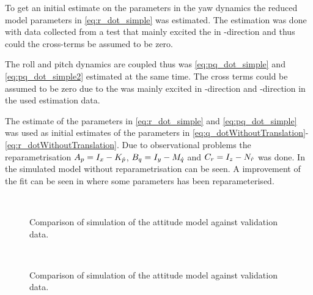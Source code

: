 To get an initial estimate on the parameters in the yaw dynamics the reduced model parameters in \eqref{eq:r_dot_simple}
was estimated. The estimation was done with data collected from a test that mainly excited the \abbrROV in \yawAngle-direction and thus could the cross-terms be assumed to be zero.

The roll and pitch dynamics are coupled thus was \eqref{eq:pq_dot_simple} and \eqref{eq:pq_dot_simple2} estimated at the same time.
The cross terms could be assumed to be zero due to the \abbrROV was mainly excited in \rollAngle-direction and \pitchAngle-direction in the used estimation data.

The estimate of the parameters in \eqref{eq:r_dot_simple} and \eqref{eq:pq_dot_simple} was used as initial estimates of the parameters in \eqref{eq:q_dotWithoutTranslation}-\eqref{eq:r_dotWithoutTranslation}. Due to observational problems the reparametrisation $A_p = I_{x} - K_{\dot{p}}$, $B_q = I_{y} - M_{\dot{q}}$ and $C_r = I_{z} - N_{\dot{r}}$ was done. In  the simulated model without reparametrisation can be seen. A improvement of the fit can be seen in  where some parameters has been reparameterised.
\begin{figure}[tbp]
  \centering
  \qquad
  \\
  \caption{\label{fig:velocityCompare}%
    Comparison of simulation of the attitude model against validation data.}
\end{figure}

\begin{figure}[tbp]
  \centering
  \qquad
  \\
  \caption{\label{fig:velocityCompareCong}%
    Comparison of simulation of the attitude model against validation data.}
\end{figure}
